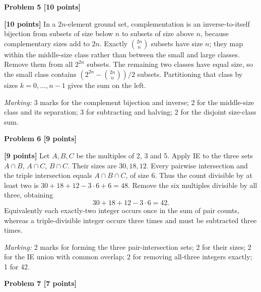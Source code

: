\documentclass[12pt,letterpaper]{article}
\newcommand{\problemheading}[2][5\baselineskip]{\Needspace{#1}\par\noindent\hspace*{-0.625in}\textbf{#2}\par\nobreak\vspace{0.3em}}
\begin{document}
\vspace{0.65em}
\problemheading[\dimexpr 3\baselineskip+4\baselineskip\relax]{Problem 5 [10 points]}
\begin{description}[font=\normalfont,leftmargin=1.2em,labelsep=0.4em]
\item[] \textbf{[10 points]} In a $2n$-element ground set, complementation is an inverse-to-itself bijection from subsets of size below $n$ to subsets of size above $n$, because complementary sizes add to $2n$. Exactly $\binom{2n}{n}$ subsets have size $n$; they map within the middle-size class rather than between the small and large classes. Remove them from all $2^{2n}$ subsets. The remaining two classes have equal size, so the small class contains $(2^{2n}-\binom{2n}{n})/2$ subsets. Partitioning that class by sizes $k=0,\ldots,n-1$ gives the sum on the left.
\par\textit{Marking:} 3 marks for the complement bijection and inverse; 2 for the middle-size class and its separation; 3 for subtracting and halving; 2 for the disjoint size-class sum.
\end{description}
\vspace{0.65em}
\problemheading[\dimexpr 3\baselineskip+4\baselineskip\relax]{Problem 6 [9 points]}
\begin{description}[font=\normalfont,leftmargin=1.2em,labelsep=0.4em]
\item[] \textbf{[9 points]} Let $A,B,C$ be the multiples of 2, 3 and 5. Apply IE to the three sets $A\cap B$, $A\cap C$, $B\cap C$. Their sizes are $30,18,12$. Every pairwise intersection and the triple intersection equals $A\cap B\cap C$, of size 6. Thus the count divisible by at least two is $30+18+12-3\cdot6+6=48$. Remove the six multiples divisible by all three, obtaining\[30+18+12-3\cdot6=42.\]Equivalently each exactly-two integer occurs once in the sum of pair counts, whereas a triple-divisible integer occurs three times and must be subtracted three times.
\par\textit{Marking:} 2 marks for forming the three pair-intersection sets; 2 for their sizes; 2 for the IE union with common overlap; 2 for removing all-three integers exactly; 1 for 42.
\end{description}
\vspace{0.65em}
\problemheading[\dimexpr 3\baselineskip+4\baselineskip\relax]{Problem 7 [7 points]}
\end{document}
